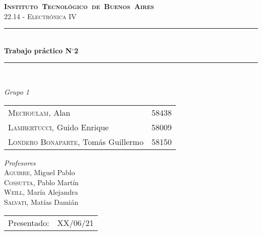 \begin{titlepage}
\newcommand{\HRule}{\rule{\linewidth}{0.5mm}}
\center
\mbox{\textsc{\LARGE \bfseries {Instituto Tecnológico de Buenos Aires}}}\\[1.5cm]
\textsc{\Large 22.14 - Electrónica IV}\\[0.5cm]


\HRule \\[0.6cm]
{ \Huge \bfseries Trabajo práctico N$^{\circ}$2}\\[0.4cm] 
\HRule \\[1.5cm]


{\large

\emph{Grupo 1}\\
\vspace{3px}

\begin{tabular}{lr} 	
\textsc{Mechoulam}, Alan  &  58438\\
\textsc{Lambertucci}, Guido Enrique  & 58009 \\
\textsc{Londero Bonaparte}, Tomás Guillermo  & 58150 \\
\end{tabular}

\vspace{20px}

\emph{Profesores}\\
\textsc{Aguirre}, Miguel Pablo\\
\textsc{Cossutta}, Pablo Martín\\
\textsc{Weill}, María Alejandra\\
\textsc{Salvati}, Matías Damián\\



\vspace{3px}

\vspace{100px}

\begin{tabular}{ll}

Presentado: & XX/06/21\\

\end{tabular}

}

\vfill

\end{titlepage}
